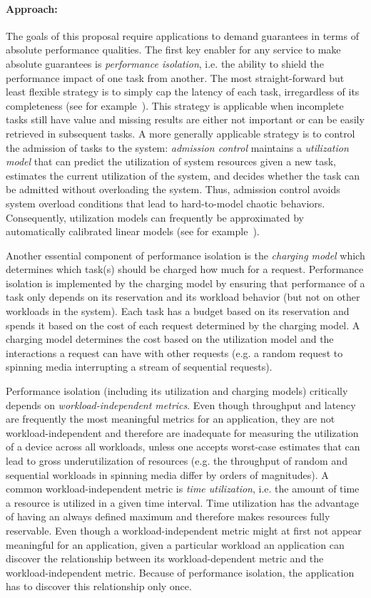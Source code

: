 \paragraph{Approach:} The goals of this proposal require applications
to demand guarantees in terms of absolute performance qualities.
The first key enabler for any service to make absolute guarantees
is \emph{performance isolation}, i.e. the ability to shield the
performance impact of one task from another. The most straight-forward
but least flexible strategy is to simply cap the latency of each
task, irregardless of its completeness (see for
example~\cite{decandia:sosp07}). This strategy is applicable when
incomplete tasks still have value and missing results are either
not important or can be easily retrieved in subsequent tasks. A
more generally applicable strategy is to control the admission of
tasks to the system: \emph{admission control} maintains a
\emph{utilization model} that can predict the utilization of system
resources given a new task, estimates the current utilization of
the system, and decides whether the task can be admitted without
overloading the system. Thus, admission control avoids system
overload conditions that lead to hard-to-model chaotic behaviors.
Consequently, utilization models can frequently be approximated by
automatically calibrated linear models (see for
example~\cite{skourtis:hpdc12}).

Another essential component of performance isolation is the
\emph{charging model} which determines which task(s) should be
charged how much for a request. Performance isolation is implemented
by the charging model by ensuring that performance of a task only
depends on its reservation and its workload behavior (but not on
other workloads in the system). Each task has a budget based on its
reservation and spends it based on the cost of each request determined
by the charging model. A charging model determines the cost based
on the utilization model and the interactions a request can have
with other requests (e.g. a random request to spinning media
interrupting a stream of sequential requests).

Performance isolation (including its utilization and charging models)
critically depends on \emph{workload-independent metrics}. Even
though throughput and latency are frequently the most meaningful
metrics for an application, they are not workload-independent and
therefore are inadequate for measuring the utilization of a device
across all workloads, unless one accepts worst-case estimates that
can lead to gross underutilization of resources (e.g. the throughput
of random and sequential workloads in spinning media differ by
orders of magnitudes). A common workload-independent metric is
\emph{time utilization}, i.e. the amount of time a resource is
utilized in a given time interval. Time utilization has the advantage
of having an always defined maximum and therefore makes resources
fully reservable. Even though a workload-independent metric might
at first not appear meaningful for an application, given a particular
workload an application can discover the relationship between its
workload-dependent metric and the workload-independent metric.
Because of performance isolation, the application has to discover
this relationship only once.

